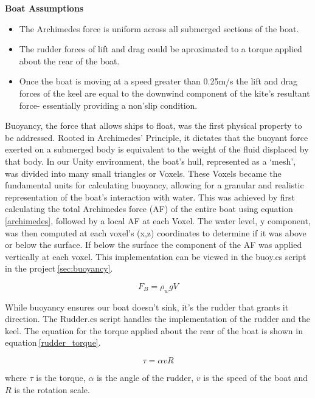 \textbf{Boat Assumptions}
\begin{itemize}
    \item The Archimedes force is uniform across all submerged sections of the boat.
    \item The rudder forces of lift and drag could be aproximated to a torque applied about the rear of the boat.
    \item Once the boat is moving at a speed greater than 0.25m/s the lift and drag forces of the keel are equal to the downwind component of the kite's resultant force- essentially providing a non'slip condition.
\end{itemize}
Buoyancy, the force that allows ships to float, was the first physical property to be addressed. Rooted in Archimedes' Principle, it dictates that the buoyant force exerted on a submerged body is equivalent to the weight of the fluid displaced by that body. In our Unity environment, the boat's hull, represented as a `mesh', was divided into many small triangles or Voxels. These Voxels became the fundamental units for calculating buoyancy, allowing for a granular and realistic representation of the boat's interaction with water. This was achieved by first calculating the total Archimedes force (AF) of the entire boat using equation$~$\ref{archimedes}, followed by a local AF at each Voxel. The water level, y component, was then computed at each voxel's (x,z) coordinates to determine if it was above or below the surface. If below the surface the component of the AF was applied vertically at each voxel. This implementation can be viewed in the buoy.cs script in the project$~$\ref{sec:buoyancy}.

\begin{equation}
    F_B = \rho_{w}gV
    \label{archimedes}
\end{equation}

While buoyancy ensures our boat doesn't sink, it's the rudder that grants it direction. The Rudder.cs script handles the implementation of the rudder and the keel. The equation for the torque applied about the rear of the boat is shown in equation$~$\ref{rudder_torque}. 

\begin{equation}
    \tau = \alpha v R
    \label{rudder_torque}
\end{equation}

where $\tau$ is the torque, $\alpha$ is the angle of the rudder, $v$ is the speed of the boat and $R$ is the rotation scale.

